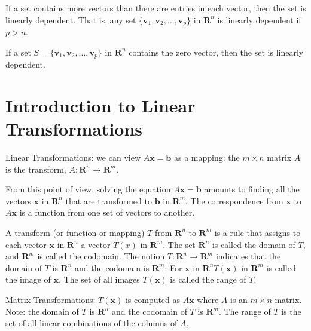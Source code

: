 \documentclass[../linalg.tex]{subfiles}
\begin{document}
\begin{theorem}
    If a set contains more vectors than there are entries in each vector, then the set is linearly dependent. That is, any set $\{\textbf{v}_1,\textbf{v}_2,\dots,\textbf{v}_p\}$ in $\textbf{R}^n$ is linearly dependent if $p>n$.
\end{theorem}

\begin{theorem}
    If a set $S=\{\textbf{v}_1,\textbf{v}_2,\dots,\textbf{v}_p\}$ in $\textbf{R}^n$ contains the zero vector, then the set is linearly dependent.
\end{theorem}

\section{Introduction to Linear Transformations}
Linear Transformations: we can view $A\textbf{x}=\textbf{b}$ as a mapping: the $m\times n$ matrix $A$ is the transform, $A:\textbf{R}^n\rightarrow \textbf{R}^m$.

From this point of view, solving the equation $A\textbf{x}=\textbf{b}$ amounts to finding all the vectors $\textbf{x}$ in $\textbf{R}^n$ that are transformed to $\textbf{b}$ in $\textbf{R}^m$. The correspondence from $\textbf{x}$ to $A\textbf{x}$ is a function from one set of vectors to another.
\begin{definition}
    A transform (or function or mapping) $T$ from $\textbf{R}^n$ to $\textbf{R}^m$ is a rule that assigns to each vector $\textbf{x}$ in $\textbf{R}^n$ a vector $T(x)$ in $\textbf{R}^m$. The set $\textbf{R}^n$ is called the domain of $T$, and 
    $\textbf{R}^m$ is called the codomain. The notion $T:\textbf{R}^n \rightarrow \textbf{R}^m$ indicates that the domain of $T$ is $\textbf{R}^n$ and the codomain is $\textbf{R}^m$. For $\textbf{x}$ in $\textbf{R}^nT(\textbf{x})$ in $\textbf{R}^m$ is called the image of $\textbf{x}$. The set of all images $T(\textbf{x})$ is called the range of $T$.
\end{definition}

Matrix Transformations: $T(\textbf{x})$ is computed as $A\textbf{x}$ where $A$ is an $m\times n$ matrix. Note: the domain of $T$ is $\textbf{R}^n$ and the codomain of $T$ is $\textbf{R}^m$. The range of $T$ is the set of all linear combinations of the columns of $A$.
\end{document}

